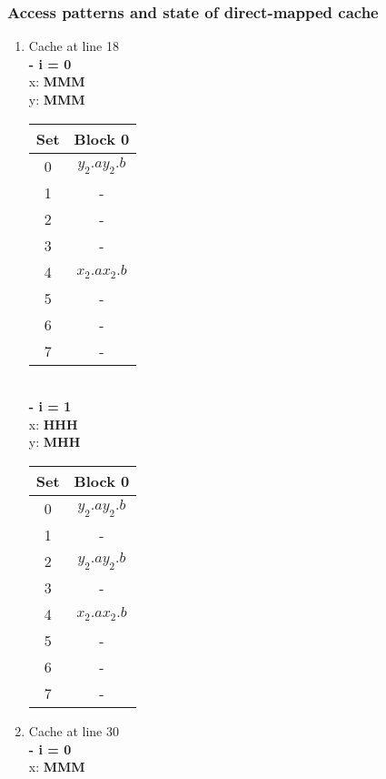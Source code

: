 \subsubsection{Access patterns and state of direct-mapped cache}
\begin{enumerate}[label=\roman*. ]
\item Cache at line 18\\
\textbf{- i = 0}\\
x: \textbf{MMM}\\
y: \textbf{MMM}
\begin{table}[h!]
    \begin{tabular}{|c|c|}
    Set & Block 0 \\ \hline
    0 & $y_2.a$\quad$y_2.b$ \\ \hline
    1 & - \\ \hline
    2 & - \\ \hline
    3 & - \\ \hline
    4 & $x_2.a$\quad$x_2.b$ \\ \hline
    5 & - \\ \hline
    6 & - \\ \hline
    7 & - \\ \hline
    \end{tabular}
    \end{table}\\
\textbf{- i = 1}\\
x: \textbf{HHH}\\
y: \textbf{MHH}\\
\begin{table}[h!]
    \begin{tabular}{|c|c|}
    Set & Block 0 \\ \hline
    0 & $y_2.a$\quad$y_2.b$ \\ \hline
    1 & - \\ \hline
    2 & $y_2.a$\quad$y_2.b$ \\ \hline
    3 & - \\ \hline
    4 & $x_2.a$\quad$x_2.b$ \\ \hline
    5 & - \\ \hline
    6 & - \\ \hline
    7 & - \\ \hline
    \end{tabular}
    \end{table}
\item Cache at line 30\\
\textbf{- i = 0}\\
x: \textbf{MMM}\\

\end{enumerate}
